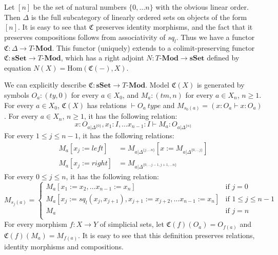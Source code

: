 \documentclass[reqno]{amsart}
\theoremstyle{definition}
\theoremstyle{remark}
\newcommand{\repl}{:=}
\newcommand{\cat}[1]{\mathbf{#1}}
\newcommand{\Mod}[1]{#1\text{-}\cat{Mod}}
\newcommand{\sSet}{\cat{sSet}}
\newcommand{\Hom}{\mathrm{Hom}}
\numberwithin{figure}{section}
\begin{document}
Let $[n]$ be the set of natural numbers $\{ 0, \ldots n \}$ with the obvious linear order.
Then $\Delta$ is the full subcategory of linearly ordered sets on objects of the form $[n]$.
It is easy to see that $\mathfrak{C}$ preserves identity morphisms,
and the fact that it preserves compositions follows from associativity of $sq_l$.
Thus we have a functor $\mathfrak{C} : \Delta \to \Mod{T}$.
This functor (uniquely) extends to a colimit-preserving functor $\mathfrak{C} : \sSet \to \Mod{T}$,
which has a right adjoint $N : \Mod{T} \to \sSet$ defined by equation $N(X) = \Hom(\mathfrak{C}(-),X)$.

We can explicitly describe $\mathfrak{C} : \sSet \to \Mod{T}$.
Model $\mathfrak{C}(X)$ is generated by symbols $O_a : (ty,0)$ for every $a \in X_0$, and $M_a : (tm,n)$ for every $a \in X_n$, $n \geq 1$.
For every $a \in X_0$, $\mathfrak{C}(X)$ has relations $\vdash O_a\ type$ and $M_{s_0(a)} = (x : O_a \vdash x : O_a)$.
For every $a \in X_n$, $n \geq 1$, it has the following relation:
\[ x : O_{a|\Delta^{\{0\}}}, x_1 : I, \ldots x_{n-1} : I \vdash M_a : O_{a|\Delta^{\{n\}}} \]
For every $1 \leq j \leq n-1$, it has the following relations:
\begin{align*}
M_a[x_j \repl left] & = M_{a|\Delta^{\{ j, \ldots n \}}}[x \repl M_{a|\Delta^{\{ 0, \ldots j \}}}] \\
M_a[x_j \repl right] & = M_{a|\Delta^{\{0, \ldots j-1, j+1, \ldots n\}}}
\end{align*}
For every $0 \leq j \leq n$, it has the following relation:
\[ M_{s_j(a)} =
\begin{cases}
    M_a[x_1 \repl x_2, \ldots x_{n-1} \repl x_n]                                      & \text{if } j = 0 \\
    M_a[x_j \repl sq_l(x_j,x_{j+1}), x_{j+1} \repl x_{j+2}, \ldots x_{n-1} \repl x_n] & \text{if } 1 \leq j \leq n-1 \\
    M_a                                                                               & \text{if } j = n \\
\end{cases}
\]
For every morphism $f : X \to Y$ of simplicial sets, let $\mathfrak{C}(f)(O_a) = O_{f(a)}$ and $\mathfrak{C}(f)(M_a) = M_{f(a)}$.
It is easy to see that this definition preserves relations, identity morphisms and compositions.
\end{document}
